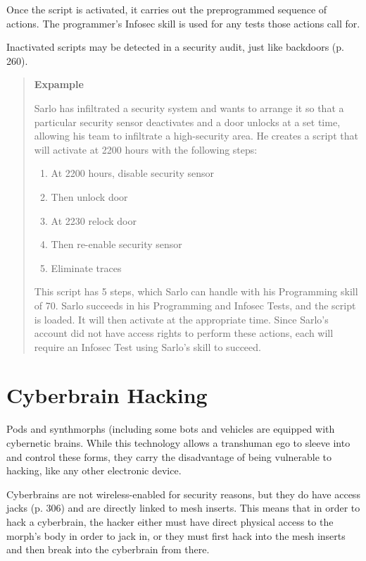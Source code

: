 Once the script is activated, it carries out the preprogrammed sequence of actions. The programmer's Infosec skill is used for any tests those actions call for. 

Inactivated scripts may be detected in a security audit, just like backdoors (p. 260). 

\begin{quotation} \textbf{Expample} 

Sarlo has infiltrated a security system and wants to arrange it so that a particular security sensor deactivates and a door unlocks at a set time, allowing his team to infiltrate a high-security area. He creates a script that will activate at 2200 hours with the following steps: \begin{enumerate} \item At 2200 hours, disable security sensor \item Then unlock door \item At 2230 relock door \item Then re-enable security sensor \item Eliminate traces \end{enumerate} 

This script has 5 steps, which Sarlo can handle with his Programming skill of 70. Sarlo succeeds in his Programming and Infosec Tests, and the script is loaded. It will then activate at the appropriate time. Since Sarlo’s account did not have access rights to perform these actions, each will require an Infosec Test using Sarlo’s skill to succeed. 

\end{quotation} 



\section{Cyberbrain Hacking} 

Pods and synthmorphs (including some bots and vehicles are equipped with cybernetic brains. While this technology allows a transhuman ego to sleeve into and control these forms, they carry the disadvantage of being vulnerable to hacking, like any other electronic device. 

Cyberbrains are not wireless-enabled for security reasons, but they do have access jacks (p. 306) and are directly linked to mesh inserts. This means that in order to hack a cyberbrain, the hacker either must have direct physical access to the morph's body in order to jack in, or they must first hack into the mesh inserts and then break into the cyberbrain from there. 

